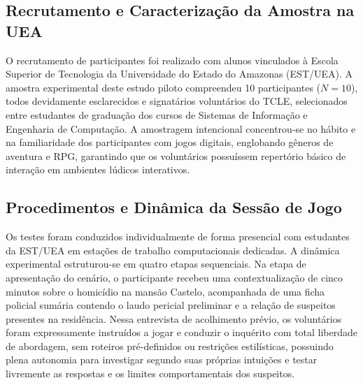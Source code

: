\subsection{Recrutamento e Caracterização da Amostra na UEA}
O recrutamento de participantes foi realizado com alunos vinculados à Escola Superior de Tecnologia da Universidade do Estado do Amazonas (EST/UEA). A amostra experimental deste estudo piloto compreendeu 10 participantes ($N = 10$), todos devidamente esclarecidos e signatários voluntários do TCLE, selecionados entre estudantes de graduação dos cursos de Sistemas de Informação e Engenharia de Computação. A amostragem intencional concentrou-se no hábito e na familiaridade dos participantes com jogos digitais, englobando gêneros de aventura e RPG, garantindo que os voluntários possuíssem repertório básico de interação em ambientes lúdicos interativos.

\subsection{Procedimentos e Dinâmica da Sessão de Jogo}
Os testes foram conduzidos individualmente de forma presencial com estudantes da EST/UEA em estações de trabalho computacionais dedicadas. A dinâmica experimental estruturou-se em quatro etapas sequenciais. Na etapa de apresentação do cenário, o participante recebeu uma contextualização de cinco minutos sobre o homicídio na mansão Castelo, acompanhada de uma ficha policial sumária contendo o laudo pericial preliminar e a relação de suspeitos presentes na residência. Nessa entrevista de acolhimento prévio, os voluntários foram expressamente instruídos a jogar e conduzir o inquérito com total liberdade de abordagem, sem roteiros pré-definidos ou restrições estilísticas, possuindo plena autonomia para investigar segundo suas próprias intuições e testar livremente as respostas e os limites comportamentais dos suspeitos.

